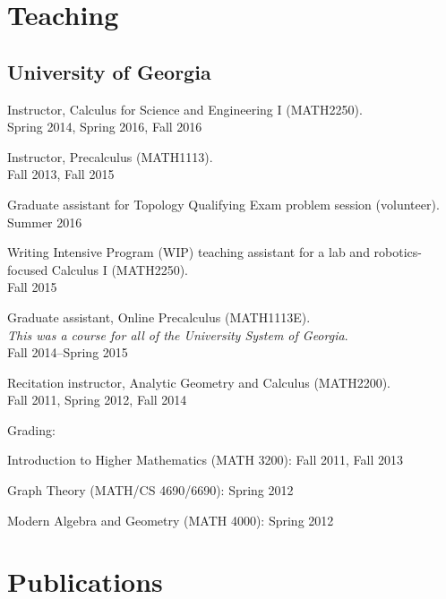 \documentclass[letterpaper]{article}
\renewenvironment{itemize}{
  \begin{list}{}{
    \setlength{\leftmargin}{1.5em}
  }
}{
  \end{list}
}
\begin{document}
\section*{Teaching}

\subsection*{University of Georgia}

\begin{enumerate}
\item Instructor, Calculus for Science and Engineering I (MATH2250). \\
  Spring 2014, Spring 2016, Fall 2016
\item Instructor, Precalculus (MATH1113). \\
  Fall 2013, Fall 2015
\item Graduate assistant for Topology Qualifying Exam problem session
  (volunteer). \\
  Summer 2016
\item Writing Intensive Program (WIP) teaching assistant for a lab and
  robotics-focused Calculus I (MATH2250). \\
  Fall 2015
\item Graduate assistant, Online Precalculus (MATH1113E). \\
  \emph{This was a course for all of the University System of Georgia}.\\
  Fall 2014--Spring 2015
\item Recitation instructor, Analytic Geometry and Calculus
  (MATH2200).\\
  Fall 2011, Spring 2012, Fall 2014
\item Grading:
  \begin{itemize}
  \item Introduction to Higher Mathematics (MATH 3200): Fall 2011, Fall 2013
  \item Graph Theory (MATH/CS 4690/6690): Spring 2012
  \item Modern Algebra and Geometry (MATH 4000): Spring 2012
  \end{itemize}

\end{enumerate}

\section*{Publications}
\end{document}
